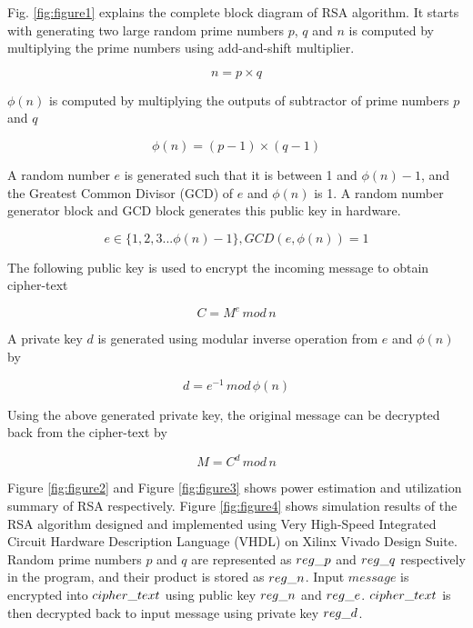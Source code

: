 \documentclass{cpp}
\begin{document}
\newpage

Fig. \ref{fig:figure1} explains the complete block diagram of RSA algorithm. It starts with generating two large random prime numbers $p$, $q$ and $n$ is computed by multiplying the prime numbers using add-and-shift multiplier.

\begin{equation}
\label{eq1}
n = p \times q
\end{equation}

$\phi(n)$ is computed by multiplying the outputs of subtractor of prime numbers $p$ and $q$

\begin{equation}
\label{eq2}
\phi(n) = (p - 1) \times (q - 1)
\end{equation}

A random number $e$ is generated such that it is between 1 and $\phi(n) - 1$, and the Greatest Common Divisor (GCD) of $e$ and $\phi(n)$ is 1. A random number generator block and GCD block generates this public key in hardware.

\begin{equation}
\label{eq3}
e \in \{1,2,3...\phi(n) - 1\}, GCD(e, \phi(n)) = 1
\end{equation}

The following public key is used to encrypt the incoming message to obtain cipher-text

\begin{equation}
\label{eq4}
C = M^e\,mod\,n
\end{equation}

A private key $d$ is generated using modular inverse operation from $e$ and $\phi(n)$ by

\begin{equation}
\label{eq5}
d = e^{-1}\,mod\,\phi(n)
\end{equation}

Using the above generated private key, the original message can be decrypted back from the cipher-text by

\begin{equation}
\label{eq6}
M = C^d\,mod\,n
\end{equation}

Figure \ref{fig:figure2} and Figure \ref{fig:figure3} shows power estimation and utilization summary of RSA respectively. Figure \ref{fig:figure4} shows simulation results of the RSA algorithm designed and implemented using Very High-Speed Integrated Circuit Hardware Description Language (VHDL) on Xilinx Vivado Design Suite. Random prime numbers $p$ and $q$ are represented as $reg \text{\textunderscore} p$ and $reg \text{\textunderscore} q$ respectively in the program, and their product is stored as $reg \text{\textunderscore} n$. Input $message$ is encrypted into $cipher \text{\textunderscore} text$ using public key $reg \text{\textunderscore} n$ and $reg \text{\textunderscore} e$. $cipher \text{\textunderscore} text$ is then decrypted back to input message using private key $reg \text{\textunderscore} d$.
\end{document}
